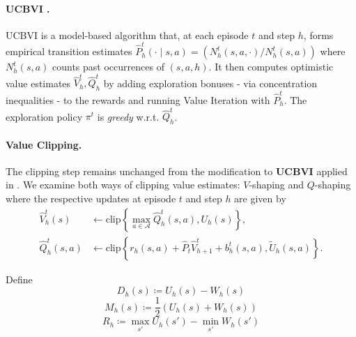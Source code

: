 \documentclass[twoside]{article}
\newcommand{\highq}{\widetilde{U}} %
\newcommand{\lowv}{W} %
\newcommand{\highv}{U} %
\begin{document}
\paragraph{UCBVI \cite{azar_minimax_2017}.} UCBVI is a model-based algorithm that, at each episode $t$ and step $h$, forms empirical transition estimates $\widehat{P}^t_h(\cdot\mid s,a){=}(N_h^t(s,a,\cdot)/N_h^t(s,a))$ 
where $N_h^t(s,a)$ counts past occurrences of $(s,a,h)$. It then computes optimistic value estimates $\widehat{V}_h^t, \widehat{Q}_h^t$ by adding exploration bonuses - via concentration inequalities - to the rewards and running Value Iteration  with $\widehat{P}^t_h$. The exploration policy $\pi^t$ is \emph{greedy} w.r.t. $\widehat{Q}_h^t$.

\paragraph{Value Clipping.}
The clipping step remains unchanged from the modification to \textbf{UCBVI} applied in \cite{gupta_unpacking_2022}. We examine both ways of clipping value estimates: $V$-shaping and $Q$-shaping where the respective updates at episode $t$ and step $h$ are given by
\begin{align*}
\widehat{V}_h^t(s) & \gets \mathrm{clip} \left \lbrace \max_{a\in\mathcal{A}} \widehat{Q}_h^t(s,a),  \highv_h(s) \right \rbrace, \\
\widehat{Q}_h^t(s,a) & \gets \mathrm{clip} \left \lbrace r_h(s,a) + \widehat{P}_t  \widehat{V}_{h+1}^t + b_h^{t}(s,a),  \highq_h(s,a) \right \rbrace.
\end{align*}

Define 
\begin{equation}
D_h(s) \coloneqq \highv_{h}(s) - \lowv_{h}(s)
\end{equation}
\begin{equation}
    M_h(s) \coloneqq \dfrac{1}{2} (\highv_{h}(s) + \lowv_{h}(s))
\end{equation}
\begin{equation}
R_{h}\coloneqq\max_{s'}\highv_{h}(s')-\min_{s'}\lowv_{h}(s')
\end{equation}
\end{document}
